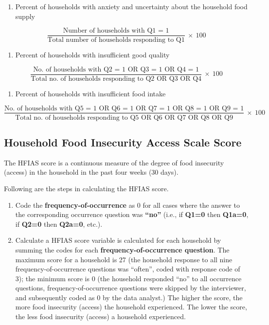 \documentclass[12pt,]{book}
\providecommand{\tightlist}{%
  \setlength{\itemsep}{0pt}\setlength{\parskip}{0pt}}
\theoremstyle{definition}
\theoremstyle{definition}
\theoremstyle{definition}
\theoremstyle{remark}
\begin{document}
\begin{enumerate}
\def\labelenumi{\arabic{enumi}.}
\tightlist
\item
  Percent of households with anxiety and uncertainty about the household
  food supply
\end{enumerate}

\[ \frac{\text{Number of households with Q1 = 1}}{\text{Total number of households responding to Q1}} ~ \times ~ 100 \]

\begin{enumerate}
\def\labelenumi{\arabic{enumi}.}
\setcounter{enumi}{1}
\tightlist
\item
  Percent of households with insufficient good quality
\end{enumerate}

\[ \frac{\text{No. of households with Q2 = 1 OR Q3 = 1 OR Q4 = 1}}{\text{Total no. of households responding to Q2 OR Q3 OR Q4}} ~ \times ~ 100 \]

\begin{enumerate}
\def\labelenumi{\arabic{enumi}.}
\setcounter{enumi}{2}
\tightlist
\item
  Percent of households with insufficient food intake
\end{enumerate}

\[ \frac{\text{No. of households with Q5 = 1 OR Q6 = 1 OR Q7 = 1 OR Q8 = 1 OR Q9 = 1}}{\text{Total no. of households responding to Q5 OR Q6 OR Q7 OR Q8 OR Q9}} ~ \times ~ 100 \]

\hypertarget{household-food-insecurity-access-scale-score}{%
\subsection{Household Food Insecurity Access Scale
Score}\label{household-food-insecurity-access-scale-score}}

The HFIAS score is a continuous measure of the degree of food insecurity
(access) in the household in the past four weeks (30 days).

Following are the steps in calculating the HFIAS score.

\begin{enumerate}
\def\labelenumi{\arabic{enumi}.}
\item
  Code the \textbf{frequency-of-occurrence} as 0 for all cases where the
  answer to the corresponding occurrence question was \textbf{``no''}
  (i.e., if \textbf{Q1=0} then \textbf{Q1a=0}, if \textbf{Q2=0} then
  \textbf{Q2a=0}, etc.).
\item
  Calculate a HFIAS score variable is calculated for each household by
  summing the codes for each \textbf{frequency-of-occurrence question}.
  The maximum score for a household is 27 (the household response to all
  nine frequency-of-occurrence questions was ``often'', coded with
  response code of 3); the minimum score is 0 (the household responded
  ``no'' to all occurrence questions, frequency-of-occurrence questions
  were skipped by the interviewer, and subsequently coded as 0 by the
  data analyst.) The higher the score, the more food insecurity (access)
  the household experienced. The lower the score, the less food
  insecurity (access) a household experienced.
\end{enumerate}
\end{document}
